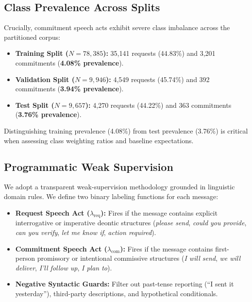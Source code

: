 \documentclass[conference]{IEEEtran}
\begin{document}
\subsection{Class Prevalence Across Splits}
Crucially, commitment speech acts exhibit severe class imbalance across the partitioned corpus:
\begin{itemize}
    \item \textbf{Training Split ($N=78,385$):} 35,141 requests (44.83\%) and 3,201 commitments (\textbf{4.08\% prevalence}).
    \item \textbf{Validation Split ($N=9,946$):} 4,549 requests (45.74\%) and 392 commitments (\textbf{3.94\% prevalence}).
    \item \textbf{Test Split ($N=9,657$):} 4,270 requests (44.22\%) and 363 commitments (\textbf{3.76\% prevalence}).
\end{itemize}
Distinguishing training prevalence (4.08\%) from test prevalence (3.76\%) is critical when assessing class weighting ratios and baseline expectations.

\subsection{Programmatic Weak Supervision}
We adopt a transparent weak-supervision methodology grounded in linguistic domain rules. We define two binary labeling functions for each message:
\begin{itemize}
    \item \textbf{Request Speech Act ($\lambda_{\text{req}}$):} Fires if the message contains explicit interrogative or imperative deontic structures (\textit{please send}, \textit{could you provide}, \textit{can you verify}, \textit{let me know if}, \textit{action required}).
    \item \textbf{Commitment Speech Act ($\lambda_{\text{com}}$):} Fires if the message contains first-person promissory or intentional commissive structures (\textit{I will send}, \textit{we will deliver}, \textit{I'll follow up}, \textit{I plan to}).
    \item \textbf{Negative Syntactic Guards:} Filter out past-tense reporting (``I sent it yesterday''), third-party descriptions, and hypothetical conditionals.
\end{itemize}
\end{document}
